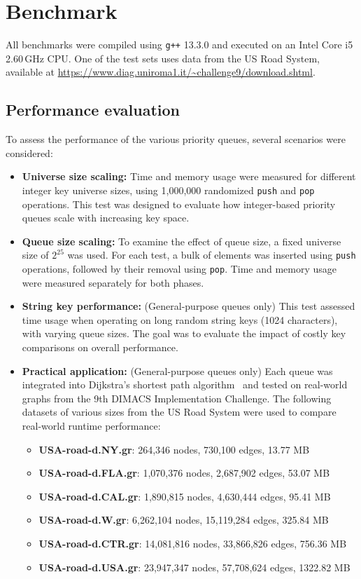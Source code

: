 \section{Benchmark}

All benchmarks were compiled using \texttt{g++} 13.3.0 and executed on an Intel Core i5 2.60\,GHz CPU. One of the test sets uses data from the US Road System, available at \url{https://www.diag.uniroma1.it/~challenge9/download.shtml}.

\subsection{Performance evaluation}

To assess the performance of the various priority queues, several scenarios were considered:

\begin{itemize}
  \item \textbf{Universe size scaling:} Time and memory usage were measured for different integer key universe sizes, using 1,000,000 randomized \texttt{push} and \texttt{pop} operations. This test was designed to evaluate how integer-based priority queues scale with increasing key space.

  \item \textbf{Queue size scaling:} To examine the effect of queue size, a fixed universe size of $2^{25}$ was used. For each test, a bulk of elements was inserted using \texttt{push} operations, followed by their removal using \texttt{pop}. Time and memory usage were measured separately for both phases.

  \item \textbf{String key performance:} (General-purpose queues only) This test assessed time usage when operating on long random string keys (1024 characters), with varying queue sizes. The goal was to evaluate the impact of costly key comparisons on overall performance.

  \item \textbf{Practical application:} (General-purpose queues only) Each queue was integrated into Dijkstra's shortest path algorithm~\cite{dijkstra1959note} and tested on real-world graphs from the 9th DIMACS Implementation Challenge. The following datasets of various sizes from the US Road System were used to compare real-world runtime performance:
  
  \begin{itemize}
  \item \textbf{USA-road-d.NY.gr}: 264,346 nodes, 730,100 edges, 13.77 MB
  \item \textbf{USA-road-d.FLA.gr}: 1,070,376 nodes, 2,687,902 edges, 53.07 MB
  \item \textbf{USA-road-d.CAL.gr}: 1,890,815 nodes, 4,630,444 edges, 95.41 MB
  \item \textbf{USA-road-d.W.gr}: 6,262,104 nodes, 15,119,284 edges, 325.84 MB
  \item \textbf{USA-road-d.CTR.gr}: 14,081,816 nodes, 33,866,826 edges, 756.36 MB
  \item \textbf{USA-road-d.USA.gr}: 23,947,347 nodes, 57,708,624 edges, 1322.82 MB
\end{itemize}
\end{itemize}

